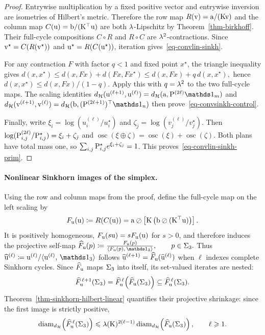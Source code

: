 \begin{proof}
Entrywise multiplication by a fixed positive vector and entrywise inversion are isometries of Hilbert's metric. Therefore the row map $R(\vD)=\a/(\K\vD)$ and the column map $C(\uD)=\b/(\K^\top\uD)$ are both $\la$-Lipschitz by Theorem~\ref{thm-birkhoff}. Their full-cycle compositions $C\circ R$ and $R\circ C$ are $\la^2$-contractions. Since $\vD^\star=C(R(\vD^\star))$ and $\uD^\star=R(C(\uD^\star))$, iteration gives~\eqref{eq-convlin-sinkh}.

For any contraction $F$ with factor $q<1$ and fixed point $x^\star$, the triangle inequality gives \(d(x,x^\star) \leq d(x,Fx)+d(Fx,Fx^\star) \leq d(x,Fx)+q\,d(x,x^\star),\)
hence $d(x,x^\star)\leq d(x,Fx)/(1-q)$. Apply this with $q=\la^2$ to the two full-cycle maps. The scaling identities
\(
\Hilbert(\uD^{(\ell+1)},\uD^{(\ell)})
=\Hilbert(\a,\P^{(2\ell)}\ones_m)
\)
and
\(
\Hilbert(\vD^{(\ell+1)},\vD^{(\ell)})
=\Hilbert(\b,(\P^{(2\ell+1)})^\top\ones_n)
\)
then prove~\eqref{eq-convsinkh-control}.

Finally, write $\xi_i=\log(u_i^{(\ell)}/u_i^\star)$ and $\zeta_j=\log(v_j^{(\ell)}/v_j^\star)$. Then $\log(\P_{i,j}^{(2\ell)}/\P_{i,j}^\star)=\xi_i+\zeta_j$ and $\operatorname{osc}(\xi\oplus\zeta)=\operatorname{osc}(\xi)+\operatorname{osc}(\zeta)$.
Both plans have total mass one, so $\sum_{i,j}\P_{i,j}^\star e^{\xi_i+\zeta_j}=1$. This proves~\eqref{eq-convlin-sinkh-prim}.
\end{proof}
\paragraph{Nonlinear Sinkhorn images of the simplex.}
Using the row and column maps from the proof, define the full-cycle map on the left scaling by
\[
F_{\uD}(\uD)
\eqdef
R(C(\uD))
=
\a\oslash\left[\K\left(\b\oslash(\K^\top\uD)\right)\right].
\]
It is positively homogeneous, $F_{\uD}(s\uD)=sF_{\uD}(\uD)$ for $s>0$, and therefore induces the projective self-map
\(\widehat F_{\uD}(p) \eqdef \frac{F_{\uD}(p)}{\dotp{F_{\uD}(p)}{\ones_3}}, \qquad p\in\simplex_3.\)
Thus $\widehat\uD^{(\ell)}\eqdef\uD^{(\ell)}/\dotp{\uD^{(\ell)}}{\ones_3}$ follows $\widehat\uD^{(\ell+1)}=\widehat F_{\uD}(\widehat\uD^{(\ell)})$ when $\ell$ indexes complete Sinkhorn cycles. Since $\widehat F_{\uD}$ maps $\simplex_3$ into itself, its set-valued iterates are nested:
\[
\widehat F_{\uD}^{\,\ell+1}(\simplex_3)
=
\widehat F_{\uD}^{\,\ell}\!\left(\widehat F_{\uD}(\simplex_3)\right)
\subseteq
\widehat F_{\uD}^{\,\ell}(\simplex_3).
\]
Theorem~\ref{thm-sinkhorn-hilbert-linear} quantifies their projective shrinkage: since the first image is strictly positive,
\[
\operatorname{diam}_{\Hilbert}\!\left(\widehat F_{\uD}^{\,\ell}(\simplex_3)\right)
\leq
\la(\K)^{2(\ell-1)}
\operatorname{diam}_{\Hilbert}\!\left(\widehat F_{\uD}(\simplex_3)\right),
\qquad \ell\geq1.
\]

